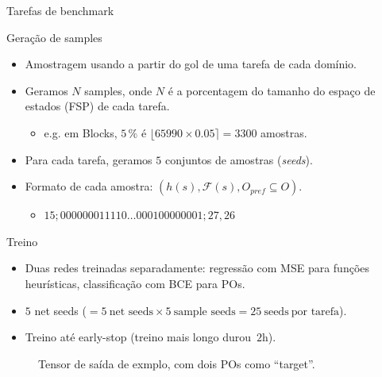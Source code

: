 \documentclass{beamer}
\begin{document}
\begin{frame}{Tarefas de benchmark}

\end{frame}

\begin{frame}{Geração de samples}
\begin{itemize}
  \item Amostragem usando \alert{\bfsrs} a partir do gol de uma tarefa de cada domínio.
  \pause
  \item Geramos $N$ samples, onde $N$ é a porcentagem do tamanho do espaço de estados (FSP) de cada tarefa.
    \begin{itemize}
      \item e.g. em Blocks, $5\,\%$ é $\lfloor 65990 \times 0.05 \rceil = 3300$ amostras.
    \end{itemize}
  \pause
  \item Para cada tarefa, geramos \alert{$5$} conjuntos de amostras (\emph{seeds}).
  \pause
  \item Formato de cada amostra: $(h(s), \mathcal{F}(s), O_{pref} \subseteq O)$.
    \begin{itemize}
      \item $15;000000011110\ldots000100000001;27,26$
    \end{itemize}
\end{itemize}
\end{frame}

\begin{frame}{Treino}
\begin{itemize}
  \item Duas redes treinadas separadamente: \alert{regressão} com MSE para funções heurísticas, \alert{classificação} com BCE para POs.
  \pause
  \item $5$ net seeds ($= 5~\text{net seeds} \times 5~\text{sample seeds} = 25~\text{seeds}~\text{por tarefa}$).
  \pause
  \item Treino até \alert{early-stop} (treino mais longo durou~$2$h).
\end{itemize}

\pause
\begin{figure}[tb]
\caption[]{Tensor de saída de exmplo, com dois POs como ``target''.}
\centering
{}
\label{fig:po-tensor}
\end{figure}

\end{frame}
\end{document}
